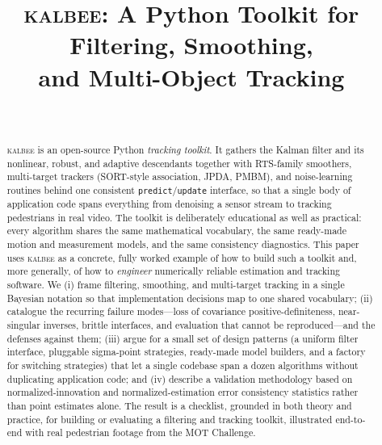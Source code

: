 \documentclass[10pt,conference]{IEEEtran}
\newcommand{\toolkit}{\textsc{kalbee}}
\begin{document}
\renewcommand{\arraystretch}{0.9}

\title{\toolkit{}: A Python Toolkit for Filtering, Smoothing,\\ and Multi-Object Tracking}

\author{
 \\
}

\maketitle

\begin{abstract}
\toolkit{} is an open-source Python \emph{tracking toolkit}. It gathers the
Kalman filter and its nonlinear, robust, and adaptive descendants together
with RTS-family smoothers, multi-target trackers (SORT-style association,
JPDA, PMBM), and noise-learning routines behind one consistent
\texttt{predict}/\texttt{update} interface, so that a single body of
application code spans everything from denoising a sensor stream to tracking
pedestrians in real video. The toolkit is deliberately educational as well as
practical: every algorithm shares the same mathematical vocabulary, the same
ready-made motion and measurement models, and the same consistency
diagnostics. This paper uses \toolkit{} as a concrete, fully worked example of
how to build such a toolkit and, more generally, of how to \emph{engineer}
numerically reliable estimation and tracking software. We (i) frame
filtering, smoothing, and multi-target tracking in a single Bayesian notation
so that implementation decisions map to one shared vocabulary; (ii) catalogue
the recurring failure modes---loss of covariance positive-definiteness,
near-singular inverses, brittle interfaces, and evaluation that cannot be
reproduced---and the defenses against them; (iii) argue for a small set of
design patterns (a uniform filter interface, pluggable sigma-point
strategies, ready-made model builders, and a factory for switching
strategies) that let a single codebase span a dozen algorithms without
duplicating application code; and (iv) describe a validation methodology
based on normalized-innovation and normalized-estimation error consistency
statistics rather than point estimates alone. The result is a checklist,
grounded in both theory and practice, for building or evaluating a filtering
and tracking toolkit, illustrated end-to-end with real pedestrian footage
from the MOT Challenge.
\end{abstract}
\end{document}
